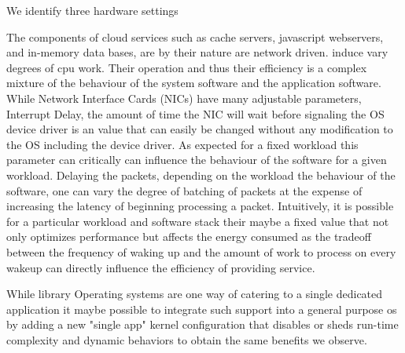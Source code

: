 We identify three hardware settings 

The components of cloud services such as cache servers, javascript webservers, and in-memory data bases, are  by their nature are network driven.  induce vary degrees of cpu work.  Their operation and thus their efficiency is a complex mixture of the behaviour of the system software and the application software.  While Network Interface Cards (NICs) have many adjustable parameters, Interrupt Delay, the amount of time the NIC will wait before signaling the OS device driver is an value that can easily be changed without any modification to the OS including the device driver.   As expected for a fixed workload this parameter can critically can influence the behaviour of the software for a given workload.  Delaying the packets, depending on the workload the behaviour of the software, one can vary the degree of batching of packets at the expense of increasing the latency of beginning processing a packet. Intuitively, it is possible for a particular workload and software stack their maybe a fixed value that not only optimizes performance but affects the energy consumed as the tradeoff between the frequency of waking up and the amount of work to process on every wakeup can directly influence the efficiency of providing service.  

 While library Operating systems are one way of catering to a single dedicated application it maybe possible to integrate such support into a general purpose os by adding a new "single app" kernel configuration that disables or sheds run-time complexity and dynamic behaviors to obtain the same benefits we observe.   